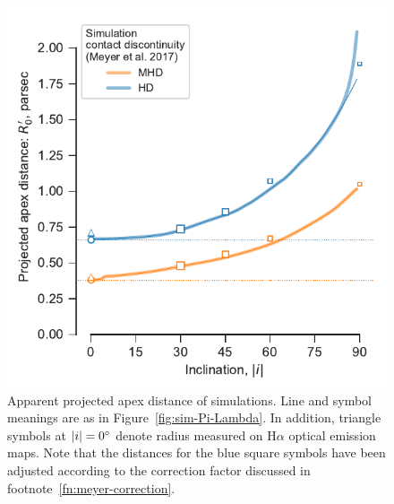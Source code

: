 \begin{figure}
  \centering
  \includegraphics[width=\linewidth]{figs/m17-r0-prime}
  \caption[]{Apparent projected apex distance of simulations.  Line
    and symbol meanings are as in Figure~\ref{fig:sim-Pi-Lambda}.  In
    addition, triangle symbols at \(\lvert i\rvert = \ang{0}\) denote radius
    measured on H\(\alpha\) optical emission maps.  Note that the distances
    for the blue square symbols have been adjusted according to the
    correction factor discussed in
    footnote~\ref{fn:meyer-correction}.}
  \label{fig:sim-R0-prime}
\end{figure}

